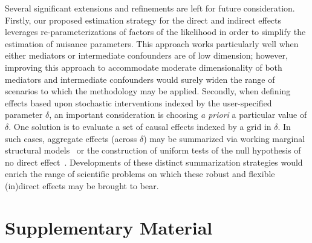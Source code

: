 Several significant extensions and refinements are left for future
consideration. Firstly, our proposed estimation strategy for the direct and
indirect effects leverages re-parameterizations of factors of the likelihood in
order to simplify the estimation of nuisance parameters. This approach works
particularly well when either mediators or intermediate confounders are of low
dimension; however, improving this approach to accommodate moderate
dimensionality of both mediators and intermediate confounders would surely widen
the range of scenarios to which the methodology may be applied. Secondly, when
defining effects based upon stochastic interventions indexed by the
user-specified parameter $\delta$, an important consideration is choosing
\textit{a priori} a particular value of $\delta$. One solution is to evaluate
a set of causal effects indexed by a grid in $\delta$. In such cases, aggregate
effects (across $\delta$) may be summarized via working marginal structural
models~\citep[e.g.,][]{hejazi2020efficient} or the construction of uniform tests
of the null hypothesis of no direct effect~\citep[e.g.,][]{diaz2020causal}.
Developments of these distinct summarization strategies would enrich the range
of scientific problems on which these robust and flexible (in)direct effects may
be brought to bear.

\section{Supplementary Material}\label{sm}

